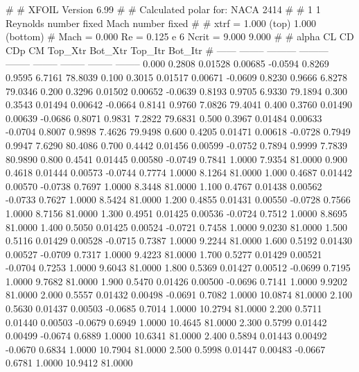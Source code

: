 #  
#       XFOIL         Version 6.99
#  
# Calculated polar for: NACA 2414                                       
#  
# 1 1 Reynolds number fixed          Mach number fixed         
#  
# xtrf =   1.000 (top)        1.000 (bottom)  
# Mach =   0.000     Re =     0.125 e 6     Ncrit =   9.000  9.000
#  
#   alpha    CL        CD       CDp       CM     Top_Xtr  Bot_Xtr  Top_Itr  Bot_Itr
#  ------ -------- --------- --------- -------- -------- -------- -------- --------
   0.000   0.2808   0.01528   0.00685  -0.0594   0.8269   0.9595   6.7161  78.8039
   0.100   0.3015   0.01517   0.00671  -0.0609   0.8230   0.9666   6.8278  79.0346
   0.200   0.3296   0.01502   0.00652  -0.0639   0.8193   0.9705   6.9330  79.1894
   0.300   0.3543   0.01494   0.00642  -0.0664   0.8141   0.9760   7.0826  79.4041
   0.400   0.3760   0.01490   0.00639  -0.0686   0.8071   0.9831   7.2822  79.6831
   0.500   0.3967   0.01484   0.00633  -0.0704   0.8007   0.9898   7.4626  79.9498
   0.600   0.4205   0.01471   0.00618  -0.0728   0.7949   0.9947   7.6290  80.4086
   0.700   0.4442   0.01456   0.00599  -0.0752   0.7894   0.9999   7.7839  80.9890
   0.800   0.4541   0.01445   0.00580  -0.0749   0.7841   1.0000   7.9354  81.0000
   0.900   0.4618   0.01444   0.00573  -0.0744   0.7774   1.0000   8.1264  81.0000
   1.000   0.4687   0.01442   0.00570  -0.0738   0.7697   1.0000   8.3448  81.0000
   1.100   0.4767   0.01438   0.00562  -0.0733   0.7627   1.0000   8.5424  81.0000
   1.200   0.4855   0.01431   0.00550  -0.0728   0.7566   1.0000   8.7156  81.0000
   1.300   0.4951   0.01425   0.00536  -0.0724   0.7512   1.0000   8.8695  81.0000
   1.400   0.5050   0.01425   0.00524  -0.0721   0.7458   1.0000   9.0230  81.0000
   1.500   0.5116   0.01429   0.00528  -0.0715   0.7387   1.0000   9.2244  81.0000
   1.600   0.5192   0.01430   0.00527  -0.0709   0.7317   1.0000   9.4223  81.0000
   1.700   0.5277   0.01429   0.00521  -0.0704   0.7253   1.0000   9.6043  81.0000
   1.800   0.5369   0.01427   0.00512  -0.0699   0.7195   1.0000   9.7682  81.0000
   1.900   0.5470   0.01426   0.00500  -0.0696   0.7141   1.0000   9.9202  81.0000
   2.000   0.5557   0.01432   0.00498  -0.0691   0.7082   1.0000  10.0874  81.0000
   2.100   0.5630   0.01437   0.00503  -0.0685   0.7014   1.0000  10.2794  81.0000
   2.200   0.5711   0.01440   0.00503  -0.0679   0.6949   1.0000  10.4645  81.0000
   2.300   0.5799   0.01442   0.00499  -0.0674   0.6889   1.0000  10.6341  81.0000
   2.400   0.5894   0.01443   0.00492  -0.0670   0.6834   1.0000  10.7904  81.0000
   2.500   0.5998   0.01447   0.00483  -0.0667   0.6781   1.0000  10.9412  81.0000
